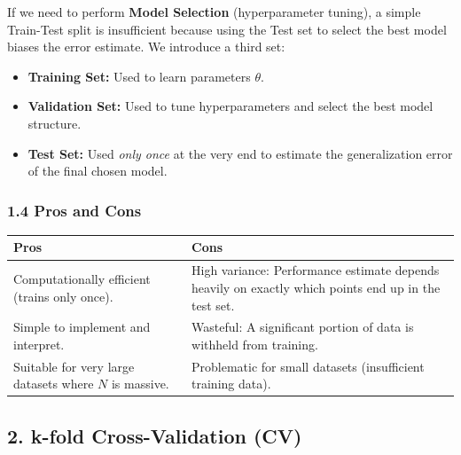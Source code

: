 \documentclass[
  italian,
  11pt,
]{article}
\newcounter{none} %
\begin{document}
If we need to perform \textbf{Model Selection} (hyperparameter tuning),
a simple Train-Test split is insufficient because using the Test set to
select the best model biases the error estimate. We introduce a third
set:

\begin{itemize}
\item
  \textbf{Training Set:} Used to learn parameters \(\theta\).
\item
  \textbf{Validation Set:} Used to tune hyperparameters and select the
  best model structure.
\item
  \textbf{Test Set:} Used \emph{only once} at the very end to estimate
  the generalization error of the final chosen model.
\end{itemize}

\subsubsection{1.4 Pros and Cons}\label{pros-and-cons}

{\def\LTcaptype{none} %
\begin{longtable}[]{@{}
  >{\raggedright\arraybackslash}p{}
  >{\raggedright\arraybackslash}p{}@{}}
\toprule\noalign{}
\begin{minipage}[b]{\linewidth}\raggedright
\textbf{Pros}
\end{minipage} & \begin{minipage}[b]{\linewidth}\raggedright
\textbf{Cons}
\end{minipage} \\
\midrule\noalign{}
\endhead
\bottomrule\noalign{}
\endlastfoot
Computationally efficient (trains only once). & High variance:
Performance estimate depends heavily on exactly which points end up in
the test set. \\
Simple to implement and interpret. & Wasteful: A significant portion of
data is withheld from training. \\
Suitable for very large datasets where \(N\) is massive. & Problematic
for small datasets (insufficient training data). \\
\end{longtable}
}

\subsection{2. k-fold Cross-Validation
(CV)}\label{k-fold-cross-validation-cv}
\end{document}
